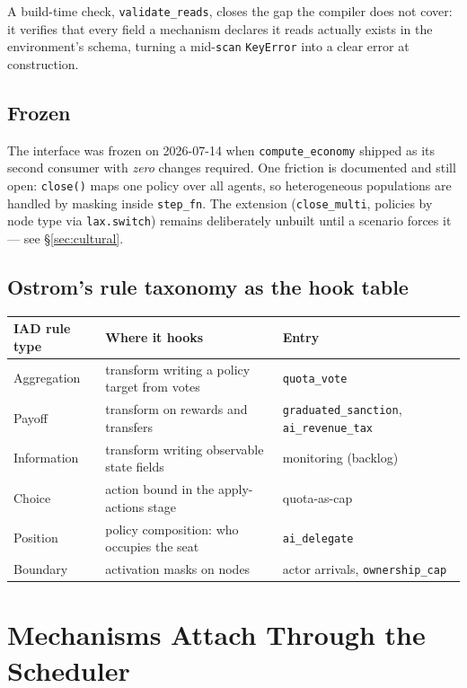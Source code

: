 \documentclass[11pt]{article}
\begin{document}
\noindent A build-time check, \texttt{validate\_reads}, closes the gap the compiler does
not cover: it verifies that every field a mechanism declares it reads actually exists in
the environment's schema, turning a mid-\texttt{scan} \texttt{KeyError} into a clear error
at construction.

\subsection{Frozen}

The interface was frozen on 2026-07-14 when \texttt{compute\_economy} shipped as its
second consumer with \emph{zero} changes required. One friction is documented and still
open: \texttt{close()} maps one policy over all agents, so heterogeneous populations are
handled by masking inside \texttt{step\_fn}. The extension (\texttt{close\_multi}, policies
by node type via \texttt{lax.switch}) remains deliberately unbuilt until a scenario forces
it --- see \S\ref{sec:cultural}.

\subsection{Ostrom's rule taxonomy as the hook table}

\begin{center}
\begin{tabular}{@{}ll>{\raggedright\arraybackslash}p{4.3cm}@{}}
\toprule
\textbf{IAD rule type} & \textbf{Where it hooks} & \textbf{Entry} \\
\midrule
Aggregation & transform writing a policy target from votes & \texttt{quota\_vote} \\
Payoff      & transform on rewards and transfers & \texttt{graduated\_sanction}, \texttt{ai\_revenue\_tax} \\
Information & transform writing observable state fields & monitoring (backlog) \\
Choice      & action bound in the apply-actions stage & quota-as-cap \\
Position    & policy composition: who occupies the seat & \texttt{ai\_delegate} \\
Boundary    & activation masks on nodes & actor arrivals, \texttt{ownership\_cap} \\
\bottomrule
\end{tabular}
\end{center}

\section{Mechanisms Attach Through the Scheduler}
\end{document}
